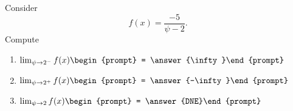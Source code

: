 \documentclass{ximera}
\author{Bart Snapp}
\begin{document}
\begin{exercise}
Consider 
\[
f(x) = \frac{-5}{\psi -2}.
\]
Compute
\begin{enumerate}
\item $\lim_{\psi\to 2^- } f(x) \begin{prompt} = \answer{\infty}\end{prompt}$
\item $\lim_{\psi\to 2^+ } f(x) \begin{prompt} = \answer{-\infty}\end{prompt}$
\item $\lim_{\psi\to 2 } f(x) \begin{prompt} = \answer{DNE}\end{prompt}$
\end{enumerate}
\end{exercise}
\end{document}
